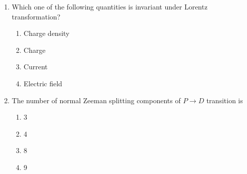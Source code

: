 \documentclass[journal,12pt,onecolumn]{IEEEtran}
\theoremstyle{remark}
\begin{document}
\begin{enumerate}
    \item Which one of the following quantities is invariant under Lorentz transformation?
        \begin{enumerate}
            \item Charge density
            \item Charge
            \item Current
            \item Electric field
        \end{enumerate}

    \item The number of normal Zeeman splitting components of $P \rightarrow D$ transition is
        \begin{enumerate}
            \item 3
            \item 4
            \item 8
            \item 9
        \end{enumerate}
\end{enumerate}
\end{document}
